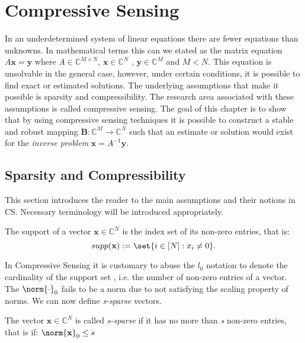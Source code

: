 

\chapter{Compressive Sensing}

In an underdetermined system of linear equations there are fewer equations than unknowns. In mathematical terms this can we stated as the matrix equation $A\mathbf{x=y}$ where $A\in \mathbb{C}^{M \times N}$, $\mathbf{x} \in \mathbb{C}^{N}$ , $\mathbf{y} \in \mathbb{C}^{M}$ and $M < N $.  This equation is unsolvable in the general case, however, under certain conditions, it is possible to find exact or estimated solutions. The underlying assumptions that make it possible is sparsity and compressibility. The research area associated with these assumptions is called compressive sensing. The goal of this chapter is to show that by using compressive sensing techniques it is possible to construct a stable and robust mapping $\mathbf{B}: \mathbb{C}^{M}\rightarrow  \mathbb{C}^{N}$ such that an estimate or solution would exist for the \emph{inverse problem} $\mathbf{x}=A^{-1}\mathbf{y}$.

\section{Sparsity and Compressibility}

This section introduces the reader to the main assumptions and their notions in CS. Necessary terminology will be introduced appropriately. 


\begin{definition} The support of a vector $\mathbf{x}	 \in \mathbb{C}^{N}$ is the index set of its non-zero entries, that is: 
$$supp(\mathbf{x}):=\set{i \in [N]: x_{i} \neq 0}.$$
	
	
\end{definition}	

In Compressive Sensing it is customary to abuse the $l_{0}$ notation to denote the cardinality of the support set , i.e. the number of non-zero entries of a vector. The $\norm{\cdot}_{0}$ fails to be a norm due to not satisfying the scaling property of norms. We can now define \emph{s-sparse} vectors.

\begin{definition}
The vector $\mathbf{x} \in \mathbb{C}^{N}$ is called \emph{s-sparse} if it has no more than \emph{s} non-zero entries, that is if: 
$\norm{\mathbf{x}}_{0} \leq s$	
	
	
\end{definition}	

